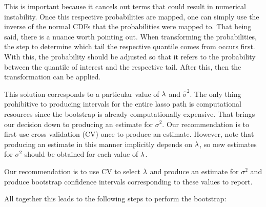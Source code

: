  
This is important because it cancels out terms that could result in numerical instability. Once this respective probabilities are mapped, one can simply use the inverse of the normal CDFs that the probabilities were mapped to. That being said, there is a nuance worth pointing out. When transforming the probabilities, the step to determine which tail the respective quantile comes from occurs first. With this, the probability should be adjusted so that it refers to the probability between the quantile of interest and the respective tail. After this, then the transformation can be applied. 


This solution corresponds to a particular value of $\lambda$ and $\hat{\sigma}^2$. The only thing prohibitive to producing intervals for the entire lasso path is computational resources since the bootstrap is already computationally expensive. That brings our decision down to producing an estimate for $\sigma^2$. Our recommendation is to first use cross validation (CV) once to produce an estimate. However, note that producing an estimate in this manner implicitly depends on $\lambda$, so new estimates for $\sigma^2$ should be obtained for each value of $\lambda$.


Our recommendation is to use CV to select $\lambda$ and produce an estimate for $\sigma^2$ and produce bootstrap confidence intervals corresponding to these values to report.

All together this leads to the following steps to perform the bootstrap:

